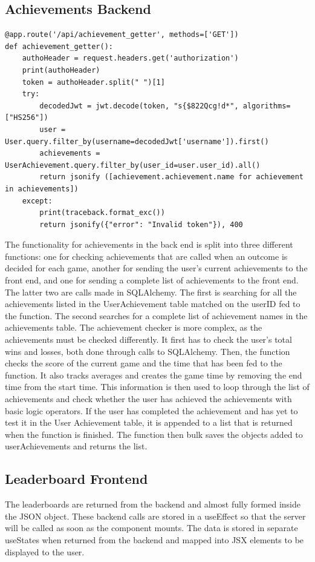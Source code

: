 \subsection{Achievements Backend}
\begin{lstlisting}[style=python, caption={The achievementGetter function.}]
@app.route('/api/achievement_getter', methods=['GET'])
def achievement_getter():
    authoHeader = request.headers.get('authorization')
    print(authoHeader)
    token = authoHeader.split(" ")[1]
    try:
        decodedJwt = jwt.decode(token, "s{$822Qcg!d*", algorithms=["HS256"])
        user = User.query.filter_by(username=decodedJwt['username']).first()
        achievements = UserAchievement.query.filter_by(user_id=user.user_id).all()
        return jsonify ([achievement.achievement.name for achievement in achievements])
    except:
        print(traceback.format_exc())
        return jsonify({"error": "Invalid token"}), 400
\end{lstlisting}
The functionality for achievements in the back end is split into three different functions: one for checking achievements that are called when an outcome is decided for each game, another for sending the user's current achievements to the front end, and one for sending a complete list of achievements to the front end. The latter two are calls made in SQLAlchemy. The first is searching for all the achievements listed in the UserAchievement table matched on the userID fed to the function. The second searches for a complete list of achievement names in the achievements table. 
The achievement checker is more complex, as the achievements must be checked differently. It first has to check the user's total wins and losses, both done through calls to SQLAlchemy. Then, the function checks the score of the current game and the time that has been fed to the function. It also tracks averages and creates the game time by removing the end time from the start time. This information is then used to loop through the list of achievements and check whether the user has achieved the achievements with basic logic operators. If the user has completed the achievement and has yet to test it in the User Achievement table, it is appended to a list that is returned when the function is finished. The function then bulk saves the objects added to userAchievements and returns the list. 

\subsection{Leaderboard Frontend}
The leaderboards are returned from the backend and almost fully formed inside the JSON object. These backend calls are stored in a useEffect so that the server will be called as soon as the component mounts. The data is stored in separate useStates when returned from the backend and mapped into JSX elements to be displayed to the user. 

